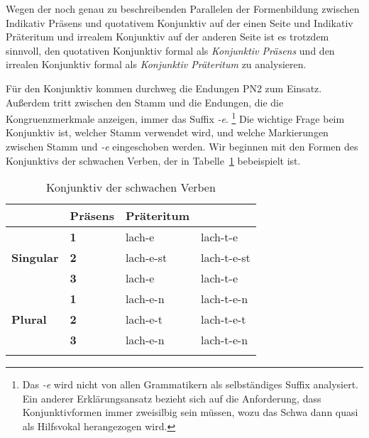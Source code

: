 \begin{exe}
  \ex\label{ex:konjunktiv085}
  \begin{xlist}
  \end{xlist}
\end{exe}

Wegen der noch genau zu beschreibenden Parallelen der Formenbildung zwischen Indikativ Präsens und quotativem Konjunktiv auf der einen Seite und Indikativ Präteritum und irrealem Konjunktiv auf der anderen Seite ist es trotzdem sinnvoll, den quotativen Konjunktiv formal als \textit{Konjunktiv Präsens} und den irrealen Konjunktiv formal als \textit{Konjunktiv Präteritum} zu analysieren.


Für den Konjunktiv kommen durchweg die Endungen PN2 zum Einsatz.
Außerdem tritt zwischen den Stamm und die Endungen, die die Kongruenzmerkmale anzeigen, immer das Suffix \textit{-e}.%
\footnote{Das \textit{-e} wird nicht von allen Grammatikern als selbständiges Suffix analysiert.
Ein anderer Erklärungsansatz bezieht sich auf die Anforderung, dass Konjunktivformen immer zweisilbig sein müssen, wozu das Schwa dann quasi als Hilfsvokal herangezogen wird.}
Die wichtige Frage beim Konjunktiv ist, welcher Stamm verwendet wird, und welche Markierungen zwischen Stamm und \textit{-e} eingeschoben werden.
Wir beginnen mit den Formen des Konjunktivs der schwachen Verben, der in Tabelle~\ref{tab:konjunktiv089} bebeispielt ist.

\begin{table}[!htbp]
  \centering
  \begin{tabular}{llll}
    \lsptoprule
    \multicolumn{2}{c}{} & \textbf{Präsens} & \textbf{Präteritum} \\
    \midrule
    \multirow{3}{*}{\textbf{Singular}} & \textbf{1} & lach-e & lach-t-e \\
    & \textbf{2} & lach-e-st & lach-t-e-st \\
    & \textbf{3} & lach-e & lach-t-e \\
    \midrule
    \multirow{3}{*}{\textbf{Plural}} & \textbf{1} & lach-e-n & lach-t-e-n \\
    & \textbf{2} & lach-e-t & lach-t-e-t \\
    & \textbf{3} & lach-e-n & lach-t-e-n \\
    \lspbottomrule
  \end{tabular}
  \caption{Konjunktiv der schwachen Verben}
  \label{tab:konjunktiv089}
\end{table}

